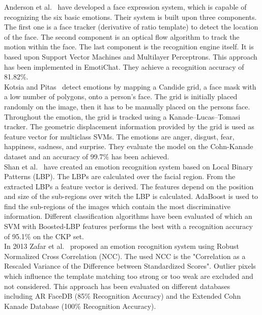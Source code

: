 Anderson et al.~\cite{Anderson06areal-time} have developed a face expression system, which is capable of recognizing the six basic emotions. Their system is built upon three components. The first one is a face tracker (derivative of ratio template) to detect the location of the face. The second component is an optical flow algorithm to track the motion within the face. The last component is the recognition engine itself. It is based upon Support Vector Machines and Multilayer Perceptrons. This approach has been implemented in EmotiChat. They achieve a recognition accuracy of 81.82\%.\\
Kotsia and Pitas~\cite{4032815} detect emotions by mapping a Candide grid, a face mask with a low number of polygons, onto a person's face. The grid is initially placed randomly on the image, then it has to be manually placed on the persons face. 
Throughout the emotion, the grid is tracked using a Kanade–Lucas–Tomasi tracker. The geometric displacement information provided by the grid is used as feature vector for multiclass SVMs. The emotions are anger, disgust, fear, happiness, sadness, and surprise. They evaluate the model on the Cohn-Kanade dataset and an accuracy of 99.7\% has been achieved.\\
Shan et al.~\cite{Shan2009803} have created an emotion recognition system based on Local Binary Patterns (LBP). The LBPs are calculated over the facial region. From the extracted LBPs a feature vector is derived. The features depend on the position and size of the sub-regions over witch the LBP is calculated. AdaBoost is used to find the sub-regions of the images which contain the most discriminative information. Different classification algorithms have been evaluated of which an SVM with Boosted-LBP features performs the best with a recognition accuracy of 95.1\% on the CKP set.\\
In 2013 Zafar et al.~\cite{6743520} proposed an emotion recognition system using Robust Normalized Cross Correlation (NCC). The used NCC is the "Correlation as a Rescaled Variance of the Difference between Standardized Scores". Outlier pixels which influence the template matching too strong or too weak are excluded and not considered. This approach has been evaluated on different databases including AR FaceDB (85\% Recognition Accuracy) and the Extended Cohn Kanade Database (100\% Recognition Accuracy).\\




